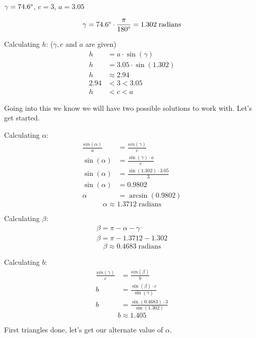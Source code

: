 \begin{problem}[14]
    $\gamma = 74.6\degree$, $c = 3$, $a = 3.05$
\end{problem}

\begin{solution}
    \[\gamma = 74.6\degree \cdot \frac{\pi}{180\degree} = 1.302 \; \text{radians}\] 
    
    Calculating $h$: ($\gamma, c$ and $a$ are given)
    \begin{align}
        h &= a \cdot \sin(\gamma) \\
        h &= 3.05 \cdot \sin(1.302) \\
        h &\approx 2.94 \\
        2.94 &< 3 < 3.05 \\
        h &< c < a
    \end{align}
    
    Going into this we know we will have two possible solutions to work with. Let's get started. \medskip
    
    Calculating $\alpha$:
    \begin{align}
       \frac{sin(\alpha)}{a} &= \frac{sin(\gamma)}{c} \\
       \sin(\alpha) &= \frac{\sin(\gamma) \cdot a}{c} \\
       \sin(\alpha) &= \frac{\sin(1.302) \cdot 3.05}{3} \\
       \sin(\alpha) &= 0.9802 \\
       \alpha &= \arcsin(0.9802)
   \end{align}
   \[\boxed{ \alpha \approx 1.3712 \; \text{radians}  }\]
   
   Calculating $\beta$:
   \begin{align}
       \beta = \pi - \alpha - \gamma \\
       \beta = \pi - 1.3712 - 1.302
   \end{align}
   \[\boxed{\beta \approx 0.4683 \; \text{radians}}\]
   
   Calculating $b$:
    \begin{align}
       \frac{sin(\gamma)}{c} &= \frac{sin(\beta)}{b} \\
       b &= \frac{\sin(\beta) \cdot c}{\sin(\gamma)} \\
       b &= \frac{\sin(0.4683) \cdot 3}{\sin(1.302)}
   \end{align}
   \[\boxed{ b \approx 1.405 }\]
   
   First triangles done, let's get our alternate value of $\alpha$. \pagebreak
   

\end{solution}
